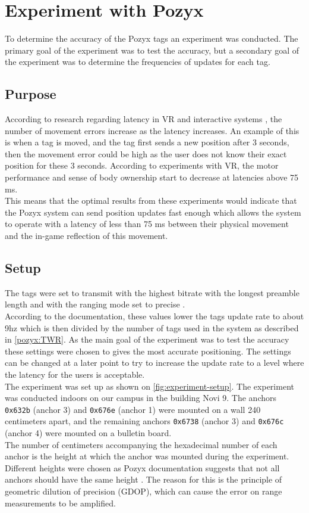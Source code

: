 \section{Experiment with Pozyx}\label{sprint1:experiment}
To determine the accuracy of the Pozyx tags an experiment was conducted.
The primary goal of the experiment was to test the accuracy, but a secondary goal of the experiment was to determine the frequencies of updates for each tag.
\\
\subsection{Purpose}
According to research regarding latency in VR \cite{WaltemateThomas2016Tiol} and interactive systems \cite{10.1145/169059.169431}, the number of movement errors increase as the latency increases.
An example of this is when a tag is moved, and the tag first sends a new position after 3 seconds, then the movement error could be high as the user does not know their exact position for these 3 seconds.
According to experiments with VR, the motor performance and sense of body ownership start to decrease at latencies above 75 ms.\\
This means that the optimal results from these experiments would indicate that the Pozyx system can send position updates fast enough which allows the system to operate with a latency of less than 75 ms between their physical movement and the in-game reflection of this movement.

\subsection{Setup}
The tags were set to transmit with the highest bitrate with the longest preamble length and with the ranging mode set to precise \cite{pozyx-Performance}.\\
According to the documentation, these values lower the tags update rate to about 9hz which is then divided by the number of tags used in the system as described in \autoref{pozyx:TWR}.
As the main goal of the experiment was to test the accuracy these settings were chosen to gives the most accurate positioning.
The settings can be changed at a later point to try to increase the update rate to a level where the latency for the users is acceptable.\\
The experiment was set up as shown on \autoref{fig:experiment-setup}.
The experiment was conducted indoors on our campus in the building Novi 9.
The anchors \texttt{0x632b} (anchor 3) and \texttt{0x676e} (anchor 1) were mounted on a wall 240 centimeters apart, and the remaining anchors \texttt{0x6738} (anchor 3) and \texttt{0x676c} (anchor 4) were mounted on a bulletin board.\\
The number of centimeters accompanying the hexadecimal number of each anchor is the height at which the anchor was mounted during the experiment.
Different heights were chosen as Pozyx documentation suggests that not all anchors should have the same height \cite{pozyx-AnchorHeights}.
The reason for this is the principle of geometric dilution of precision (GDOP), which can cause the error on range measurements to be amplified.

